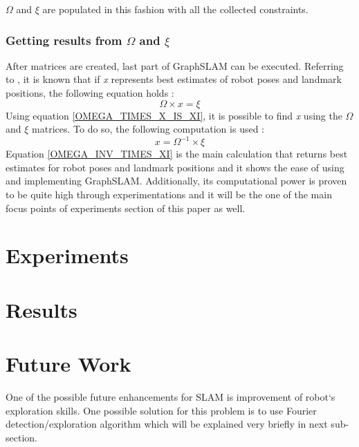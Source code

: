 \documentclass{ba-kecs}
\numberwithin{figure}{section}
\numberwithin{equation}{section}
\begin{document}
	$\Omega$ and $\xi$ are populated in this fashion with all the collected constraints.
	
\subsubsection{Getting results from $\Omega$ and $\xi$}
	After matrices are created, last part of GraphSLAM can be executed. Referring to \cite{sik2}, it is known that if \textit{x} represents best estimates of robot poses and landmark positions, the following equation holds :
	\begin{equation}
	\Omega \times x = \xi \label{OMEGA_TIMES_X_IS_XI}
	\end{equation}
	Using equation \eqref{OMEGA_TIMES_X_IS_XI}, it is possible to find \textit{x} using the $\Omega$ and $\xi$ matrices. To do so, the following computation is used :
	\begin{equation}
	x = \Omega^{-1} \times \xi \label{OMEGA_INV_TIMES_XI}
	\end{equation}
	Equation \eqref{OMEGA_INV_TIMES_XI} is the main calculation that returns best estimates for robot poses and landmark positions and it shows the ease of using and implementing GraphSLAM. Additionally, its computational power is proven to be quite high through experimentations\cite{sik,sik2} and it will be the one of the main focus points of experiments section of this paper as well.



\section{Experiments}


\section{Results}


\section{Future Work}

	One of the possible future enhancements for SLAM is improvement of robot`s exploration skills. One possible solution for this problem is to use Fourier detection/exploration algorithm which will be explained very briefly in next sub-section.
	
\end{document}
